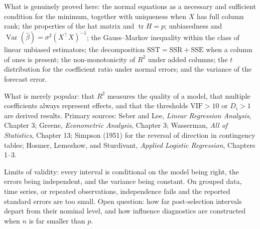 \begin{untukpeneliti}
What is genuinely proved here: the normal equations as a necessary and sufficient condition for
the minimum, together with uniqueness when $X$ has full column rank; the properties of the hat
matrix and $\operatorname{tr}H=p$; unbiasedness and $\operatorname{Var}(\hat\beta)=\sigma^2
(X^{\top}X)^{-1}$; the Gauss--Markov inequality within the class of linear unbiased estimators;
the decomposition $\mathrm{SST}=\mathrm{SSR}+\mathrm{SSE}$ when a column of ones is present; the
non-monotonicity of $R^2$ under added columns; the $t$ distribution for the coefficient ratio
under normal errors; and the variance of the forecast error.

What is merely popular: that $R^2$ measures the quality of a model, that multiple coefficients
always represent effects, and that the thresholds $\mathrm{VIF}>10$ or $D_i>1$ are derived
results. Primary sources: Seber and Lee, \emph{Linear Regression Analysis}, Chapter 3; Greene,
\emph{Econometric Analysis}, Chapter 3; Wasserman, \emph{All of Statistics}, Chapter 13;
Simpson (1951) for the reversal of direction in contingency tables; Hosmer, Lemeshow, and
Sturdivant, \emph{Applied Logistic Regression}, Chapters 1--3.

Limits of validity: every interval is conditional on the model being right, the errors being
independent, and the variance being constant. On grouped data, time series, or repeated
observations, independence fails and the reported standard errors are too small. Open question:
how far post-selection intervals depart from their nominal level, and how influence diagnostics
are constructed when $n$ is far smaller than $p$.
\end{untukpeneliti}

